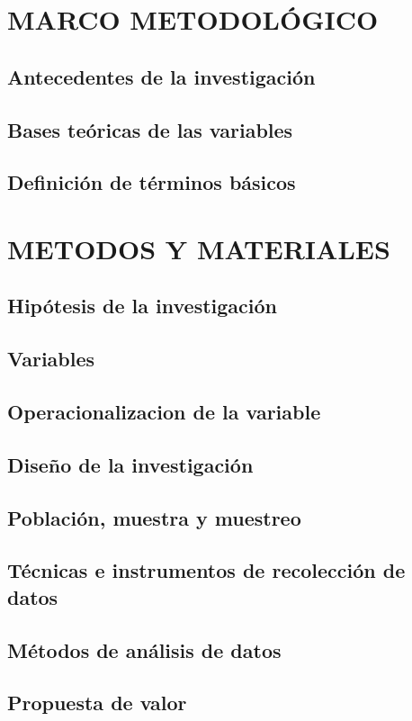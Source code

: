 


\section{MARCO METODOLÓGICO}
\subsection{Antecedentes de la investigación}
\subsection{Bases teóricas de las variables}
\subsection{Definición de términos básicos}

\section{METODOS Y MATERIALES}
\subsection{Hipótesis de la investigación}
\subsection{Variables}
\subsection{Operacionalizacion de la variable}
\subsection{Diseño de la investigación}
\subsection{Población, muestra y muestreo}
\subsection{Técnicas e instrumentos de recolección de datos}
\subsection{Métodos de análisis de datos}
\subsection{Propuesta de valor}
